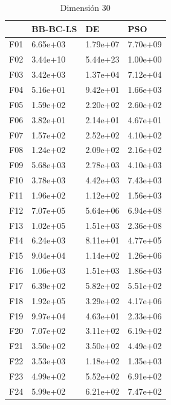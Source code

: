 \begin{table}[H]
\begin{minipage}{.5\linewidth}
    \end{minipage}%
    \begin{minipage}{.5\linewidth}
      \centering
        \caption{Dimensión 30}
        \begin{tabular}{llll}
            \toprule
            {} &  BB-BC-LS &        DE &       PSO \\
            \midrule
            F01  &  6.65e+03 &  1.79e+07 &  7.70e+09 \\
            F02  &  3.44e+10 &  5.44e+23 &  1.00e+00 \\
            F03  &  3.42e+03 &  1.37e+04 &  7.12e+04 \\
            F04  &  5.16e+01 &  9.42e+01 &  1.66e+03 \\
            F05  &  1.59e+02 &  2.20e+02 &  2.60e+02 \\
            F06  &  3.82e+01 &  2.14e+01 &  4.67e+01 \\
            F07  &  1.57e+02 &  2.52e+02 &  4.10e+02 \\
            F08  &  1.24e+02 &  2.09e+02 &  2.16e+02 \\
            F09  &  5.68e+03 &  2.78e+03 &  4.10e+03 \\
            F10  &  3.78e+03 &  4.42e+03 &  7.43e+03 \\
            F11  &  1.96e+02 &  1.12e+02 &  1.56e+03 \\
            F12  &  7.07e+05 &  5.64e+06 &  6.94e+08 \\
            F13  &  1.02e+05 &  1.51e+03 &  2.36e+08 \\
            F14  &  6.24e+03 &  8.11e+01 &  4.77e+05 \\
            F15  &  9.04e+04 &  1.14e+02 &  1.26e+06 \\
            F16  &  1.06e+03 &  1.51e+03 &  1.86e+03 \\
            F17  &  6.39e+02 &  5.82e+02 &  5.51e+02 \\
            F18  &  1.92e+05 &  3.29e+02 &  4.17e+06 \\
            F19  &  9.97e+04 &  4.63e+01 &  2.33e+06 \\
            F20  &  7.07e+02 &  3.11e+02 &  6.19e+02 \\
            F21  &  3.50e+02 &  3.50e+02 &  4.49e+02 \\
            F22  &  3.53e+03 &  1.18e+02 &  1.35e+03 \\
            F23  &  4.99e+02 &  5.52e+02 &  6.91e+02 \\
            F24  &  5.99e+02 &  6.21e+02 &  7.47e+02 \\

\end{tabular}
\end{minipage}
\end{table}

